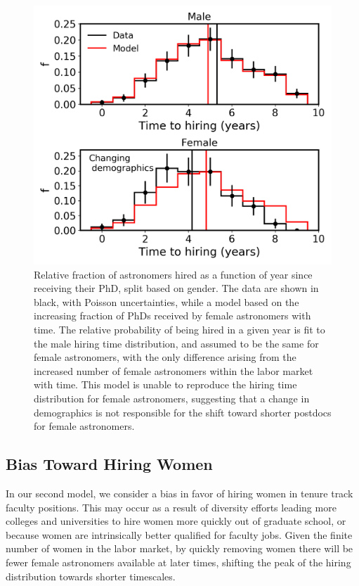 \documentclass[modern]{aastex62}
\begin{document}
\begin{figure}[!hbt]
\center
\includegraphics[scale=.6]{model1.png}
\caption{Relative fraction of astronomers hired as a function of year since receiving their PhD, split based on gender. The data are shown in black, with Poisson uncertainties, while a model based on the increasing fraction of PhDs received by female astronomers with time. The relative probability of being hired in a given year is fit to the male hiring time distribution, and assumed to be the same for female astronomers, with the only difference arising from the increased number of female astronomers within the labor market with time. This model is unable to reproduce the hiring time distribution for female astronomers, suggesting that a change in demographics is not responsible for the shift toward shorter postdocs for female astronomers.  \label{model1}}
\end{figure}
 

\subsection{Bias Toward Hiring Women}
In our second model, we consider a bias in favor of hiring women in tenure track faculty positions. This may occur as a result of diversity efforts leading more colleges and universities to hire women more quickly out of graduate school, or because women are intrinsically better qualified for faculty jobs. Given the finite number of women in the labor market, by quickly removing women there will be fewer female astronomers available at later times, shifting the peak of the hiring distribution towards shorter timescales.
\end{document}
